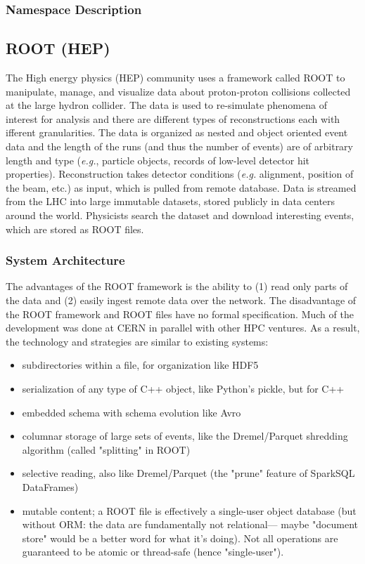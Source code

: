 \subsubsection{Namespace Description}

\subsection{ROOT (HEP)}

The High energy physics (HEP) community uses a framework called ROOT to
manipulate, manage, and visualize data about proton-proton collisions
collected at the large hydron collider. The data is used to re-simulate
phenomena of interest for analysis and there are different types of
reconstructions each with ifferent granularities. The data is organized as
nested and object oriented event data and the length of the runs (and thus
the number of events) are of arbitrary length and type ({\it e.g.},
particle objects, records of low-level detector hit properties).
Reconstruction takes detector conditions ({\it e.g.} alignment, position of
the beam, etc.) as input, which is pulled from remote database.  Data is
streamed from the LHC into large immutable datasets, stored publicly in
data centers around the world.  Physicists search the dataset and download
interesting events, which are stored as ROOT files. 

\subsubsection{System Architecture}

The advantages of the ROOT framework is the ability to (1) read only parts
of the data and (2) easily ingest remote data over the network. The
disadvantage of the ROOT framework and ROOT files have no formal
specification. Much of the development was done at CERN in parallel with
other HPC ventures. As a result, the technology and strategies are similar
to existing systems:

\begin{itemize}
  \item subdirectories within a file, for organization like HDF5
  \item serialization of any type of C++ object, like Python's pickle, but for C++
  \item embedded schema with schema evolution like Avro
  \item columnar storage of large sets of events, like the Dremel/Parquet shredding algorithm (called "splitting" in ROOT)
  \item selective reading, also like Dremel/Parquet (the "prune" feature of SparkSQL DataFrames)
  \item mutable content; a ROOT file is effectively a single-user object database (but without ORM: the data are fundamentally not relational— maybe "document store" would be a better word for what it's doing). Not all operations are guaranteed to be atomic or thread-safe (hence "single-user").
\end{itemize}

